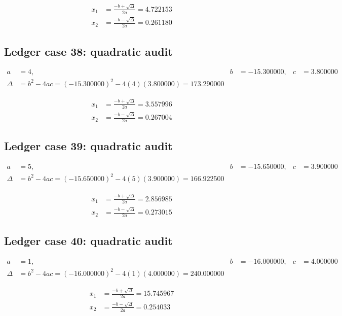 \documentclass[11pt,a4paper]{article}
\begin{document}
\begin{align}
x_1 &= \frac{-b+\sqrt{\Delta}}{2a} = 4.722153 \\
x_2 &= \frac{-b-\sqrt{\Delta}}{2a} = 0.261180
\end{align}

\subsection{Ledger case 38: quadratic audit}
\begin{align}
a &= 4, & b &= -15.300000, & c &= 3.800000 \\
\Delta &= b^2-4ac = (-15.300000)^2 - 4(4)(3.800000) = 173.290000
\end{align}

\begin{align}
x_1 &= \frac{-b+\sqrt{\Delta}}{2a} = 3.557996 \\
x_2 &= \frac{-b-\sqrt{\Delta}}{2a} = 0.267004
\end{align}

\subsection{Ledger case 39: quadratic audit}
\begin{align}
a &= 5, & b &= -15.650000, & c &= 3.900000 \\
\Delta &= b^2-4ac = (-15.650000)^2 - 4(5)(3.900000) = 166.922500
\end{align}

\begin{align}
x_1 &= \frac{-b+\sqrt{\Delta}}{2a} = 2.856985 \\
x_2 &= \frac{-b-\sqrt{\Delta}}{2a} = 0.273015
\end{align}

\newpage

\subsection{Ledger case 40: quadratic audit}
\begin{align}
a &= 1, & b &= -16.000000, & c &= 4.000000 \\
\Delta &= b^2-4ac = (-16.000000)^2 - 4(1)(4.000000) = 240.000000
\end{align}

\begin{align}
x_1 &= \frac{-b+\sqrt{\Delta}}{2a} = 15.745967 \\
x_2 &= \frac{-b-\sqrt{\Delta}}{2a} = 0.254033
\end{align}
\end{document}
